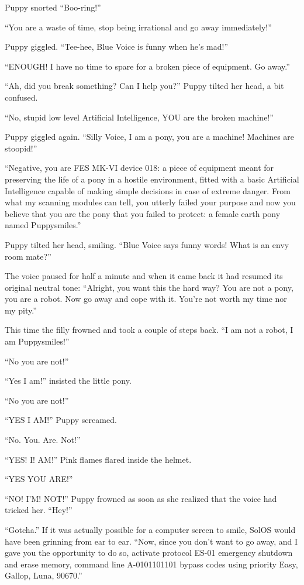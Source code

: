 Puppy snorted ``Boo-ring!''

``You are a waste of time, stop being irrational and go away immediately!''

Puppy giggled. ``Tee-hee, Blue Voice is funny when he's mad!''

``ENOUGH! I have no time to spare for a broken piece of equipment. Go away.''

``Ah, did you break something? Can I help you?'' Puppy tilted her head, a bit confused.

``No, stupid low level Artificial Intelligence, YOU are the broken machine!''

Puppy giggled again. ``Silly Voice, I am a pony, you are a machine! Machines are stoopid!''

``{\mt Negative, you are FES MK-VI device 018: a piece of equipment meant for preserving the life of a pony in a hostile environment, fitted with a basic Artificial Intelligence capable of making simple decisions in case of extreme danger. From what my scanning modules can tell, you utterly failed your purpose and now you believe that you are the pony that you failed to protect: a female earth pony named Puppysmiles.}''

Puppy tilted her head, smiling. ``Blue Voice says funny words! What is an envy room mate?''

The voice paused for half a minute and when it came back it had resumed its original neutral tone: ``Alright, you want this the hard way? You are not a pony, you are a robot. Now go away and cope with it. You're not worth my time nor my pity.''

This time the filly frowned and took a couple of steps back. ``I am not a robot, I am Puppysmiles!''

``No you are not!''

``Yes I am!'' insisted the little pony.

``No you are not!''

``YES I AM!'' Puppy screamed.

``No. You. Are. Not!''

``YES! I! AM!'' Pink flames flared inside the helmet.

``YES YOU ARE!''

``NO! I'M! NOT!'' Puppy frowned as soon as she realized that the voice had tricked her. ``Hey!''

``Gotcha.'' If it was actually possible for a computer screen to smile, SolOS would have been grinning from ear to ear. ``Now, since you don't want to go away, and I gave you the opportunity to do so, activate protocol ES-01 emergency shutdown and erase memory, command line A-0101101101 bypass codes using priority Easy, Gallop, Luna, 90670.''


